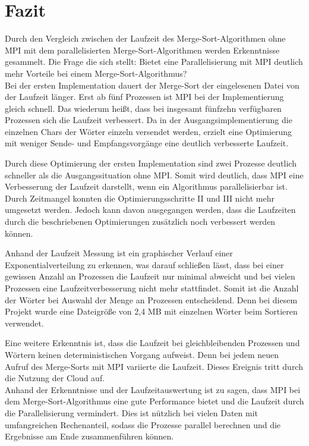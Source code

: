\section{Fazit}
Durch den Vergleich zwischen der Laufzeit des Merge-Sort-Algorithmen ohne MPI mit dem parallelisierten Merge-Sort-Algorithmen werden Erkenntnisse gesammelt. Die Frage die sich stellt: Bietet eine Parallelisierung mit MPI deutlich mehr Vorteile bei einem Merge-Sort-Algorithmus?\\

Bei der ersten Implementation dauert der Merge-Sort der eingelesenen Datei von der Laufzeit länger. Erst ab fünf Prozessen ist MPI bei der Implementierung gleich schnell. Das wiederum heißt, dass bei insgesamt fünfzehn verfügbaren Prozessen sich die Laufzeit verbessert. Da in der Ausgangsimplementierung die einzelnen Chars der Wörter einzeln versendet werden, erzielt eine Optimierung mit weniger Sende- und Empfangsvorgänge eine deutlich verbesserte Laufzeit.

Durch diese Optimierung der ersten Implementation sind zwei Prozesse deutlich schneller als die Ausgangssituation ohne MPI. Somit wird deutlich, dass MPI eine Verbesserung der Laufzeit darstellt, wenn ein Algorithmus parallelisierbar ist. Durch Zeitmangel konnten die Optimierungsschritte II und III nicht mehr umgesetzt werden. Jedoch kann davon ausgegangen werden, dass die Laufzeiten durch die beschriebenen Optimierungen zusätzlich noch verbessert werden können.

Anhand der Laufzeit Messung ist ein graphischer Verlauf einer Exponentialverteilung zu erkennen, was darauf schließen lässt, dass bei einer gewissen Anzahl an Prozessen die Laufzeit nur minimal abweicht und bei vielen Prozessen eine Laufzeitverbesserung nicht mehr stattfindet. Somit ist die Anzahl der Wörter bei Auswahl der Menge an Prozessen entscheidend. Denn bei diesem Projekt wurde eine Dateigröße von 2,4 MB mit einzelnen Wörter beim Sortieren verwendet.  

Eine weitere Erkenntnis ist, dass die Laufzeit bei gleichbleibenden Prozessen und Wörtern keinen deterministischen Vorgang aufweist. Denn bei jedem neuen Aufruf des Merge-Sorts mit MPI variierte die Laufzeit. Dieses Ereignis tritt durch die Nutzung der Cloud auf.\\

Anhand der Erkenntnisse und der Laufzeitauswertung ist zu sagen, dass MPI bei dem Merge-Sort-Algorithmus eine gute Performance bietet und die Laufzeit durch die Parallelisierung vermindert. Dies ist nützlich bei vielen Daten mit umfangreichen Rechenanteil, sodass die Prozesse parallel berechnen und die Ergebnisse am Ende zusammenführen können.